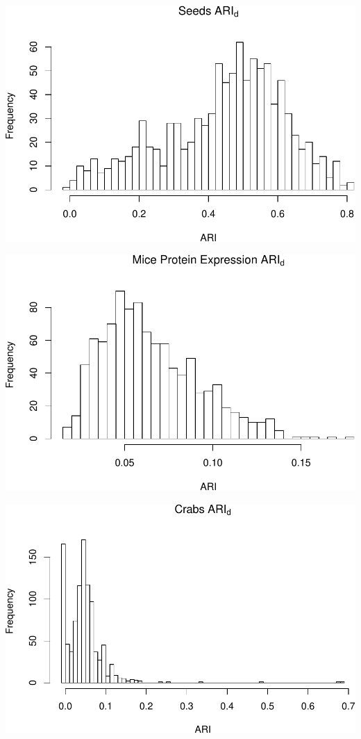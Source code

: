 \documentclass[]{article}
\begin{document}
\begin{center}\includegraphics[width=1\linewidth]{Report_files/figure-latex/unnamed-chunk-15-5} \end{center}

\begin{center}\includegraphics[width=1\linewidth]{Report_files/figure-latex/unnamed-chunk-15-6} \end{center}

\begin{center}\includegraphics[width=1\linewidth]{Report_files/figure-latex/unnamed-chunk-15-7} \end{center}
\end{document}
